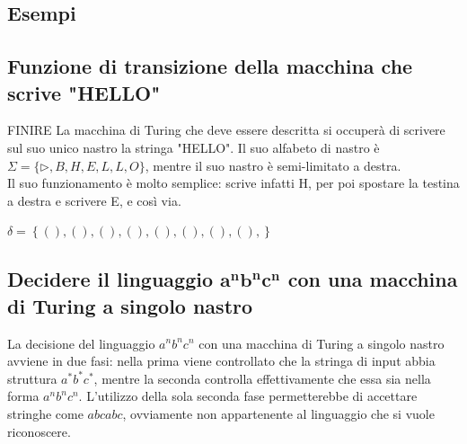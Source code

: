 \subsection*{Esempi}

\subsection{Funzione di transizione della macchina che scrive "HELLO"}
FINIRE
La macchina di Turing che deve essere descritta si occuperà di scrivere sul suo unico nastro la stringa "HELLO".
Il suo alfabeto di nastro è $\Sigma = \{ \triangleright , B, H, E, L, L, O \}$, mentre il suo nastro è semi-limitato a destra.\\
Il suo funzionamento è molto semplice: scrive infatti H, per poi spostare la testina a destra e scrivere E, e così via.

$\delta = \left\{ 
(),
(),
(),
(),
(),
(),
(),
(),
\right\}$

\subsection{Decidere il linguaggio $\mathbf{a^nb^nc^n}$ con una macchina di Turing a singolo nastro}
La decisione del linguaggio $a^nb^nc^n$ con una macchina di Turing a singolo nastro avviene in due fasi: nella prima viene controllato che la stringa di input abbia struttura $a^*b^*c^*$, mentre la seconda controlla effettivamente che essa sia nella forma $a^nb^nc^n$.
L'utilizzo della sola seconda fase permetterebbe di accettare stringhe come $abcabc$, ovviamente non appartenente al linguaggio che si vuole riconoscere.

